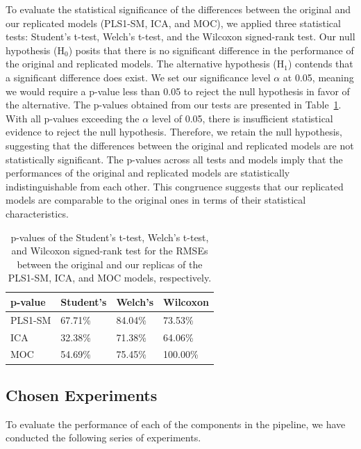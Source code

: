 To evaluate the statistical significance of the differences between the original and our replicated models (PLS1-SM, ICA, and MOC), we applied three statistical tests: Student's t-test, Welch's t-test, and the Wilcoxon signed-rank test.
Our null hypothesis (H$_0$) posits that there is no significant difference in the performance of the original and replicated models.
The alternative hypothesis (H$_1$) contends that a significant difference does exist.
We set our significance level $\alpha$ at 0.05, meaning we would require a p-value less than 0.05 to reject the null hypothesis in favor of the alternative.
The p-values obtained from our tests are presented in Table~\ref{tab:results_ttests}. With all p-values exceeding the $\alpha$ level of 0.05, there is insufficient statistical evidence to reject the null hypothesis.
Therefore, we retain the null hypothesis, suggesting that the differences between the original and replicated models are not statistically significant.
The p-values across all tests and models imply that the performances of the original and replicated models are statistically indistinguishable from each other.
This congruence suggests that our replicated models are comparable to the original ones in terms of their statistical characteristics.

\begin{table}[h]
\centering
\begin{tabular}{llll}
\hline
p-value    & Student's & Welch's & Wilcoxon \\
\hline
PLS1-SM    & 67.71\% & 84.04\% & 73.53\% \\
ICA        & 32.38\% & 71.38\% & 64.06\% \\
MOC        & 54.69\% & 75.45\% & 100.00\% \\
\hline
\end{tabular}
\caption{p-values of the Student's t-test, Welch's t-test, and Wilcoxon signed-rank test for the RMSEs between the original and our replicas of the PLS1-SM, ICA, and MOC models, respectively.}
\label{tab:results_ttests}
\end{table}

\subsection{Chosen Experiments}\label{sec:chosen_experiments}
To evaluate the performance of each of the components in the pipeline, we have conducted the following series of experiments.

